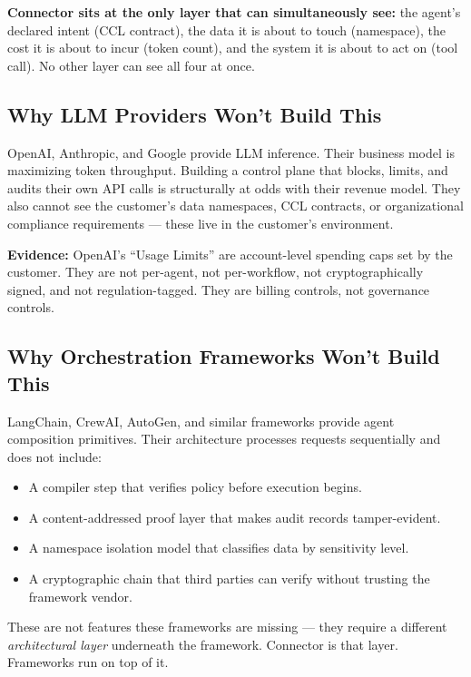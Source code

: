 \documentclass[11pt,a4paper]{article}
\begin{document}
\textbf{Connector sits at the only layer that can simultaneously see:}
the agent's declared intent (CCL contract), the data it is about to touch (namespace), the cost
it is about to incur (token count), and the system it is about to act on (tool call).
No other layer can see all four at once.

\subsection{Why LLM Providers Won't Build This}

OpenAI, Anthropic, and Google provide LLM inference. Their business model is maximizing token throughput.
Building a control plane that blocks, limits, and audits their own API calls is structurally at odds
with their revenue model. They also cannot see the customer's data namespaces, CCL contracts, or
organizational compliance requirements — these live in the customer's environment.

\textbf{Evidence:} OpenAI's ``Usage Limits'' are account-level spending caps set by the customer.
They are not per-agent, not per-workflow, not cryptographically signed, and not regulation-tagged.
They are billing controls, not governance controls.

\subsection{Why Orchestration Frameworks Won't Build This}

LangChain, CrewAI, AutoGen, and similar frameworks provide agent composition primitives.
Their architecture processes requests sequentially and does not include:

\begin{itemize}
  \item A compiler step that verifies policy before execution begins.
  \item A content-addressed proof layer that makes audit records tamper-evident.
  \item A namespace isolation model that classifies data by sensitivity level.
  \item A cryptographic chain that third parties can verify without trusting the framework vendor.
\end{itemize}

These are not features these frameworks are missing — they require a different \emph{architectural layer}
underneath the framework. Connector is that layer. Frameworks run on top of it.
\end{document}
